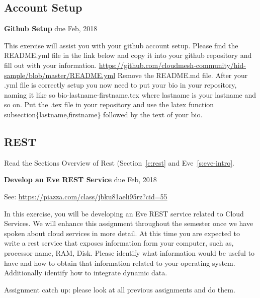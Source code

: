 \subsection{Account Setup}

\begin{exercise} {\bf Github Setup} due Feb, 2018

This exercise will assist you with your github account setup. Please find the README.yml file in the link below and copy it into your github repository and fill out with your information. \url{https://github.com/cloudmesh-community/hid-sample/blob/master/README.yml} Remove the README.md file. After your .yml file is correctly setup you now need to put your bio in your repository, naming it like so bio-lastname-firstname.tex where lastname is your lastname and so on. Put the .tex file in your repository and use the latex function subsection\{lastname,firstname\} followed by the text of your bio.

\end{exercise}

\subsection{REST}
\begin{exercise}
Read the Sections Overview of Rest (Section~\ref{c:rest} and Eve~\ref{s:eve-intro}.
\end{exercise}

\begin{exercise} {\bf Develop an Eve REST Service} due Feb, 2018

See: \url{https://piazza.com/class/jbku81aeli95rz?cid=55}

In this exercise, you will be developing an Eve REST service related
to Cloud Services. We will enhance this assignment throughout the
semester once we have spoken about cloud services in more detail. At
this time you are expected to write a rest service that exposes
information form your computer, such as, processor name, RAM,
Disk. Please identify what information would be useful to have and how
to obtain that information related to your operating system. Additionally identify how to integrate dynamic data.

\end{exercise}

\begin{exercise}
Assignment catch up: please look at all previous assignments and do
them. 
\end{exercise}

